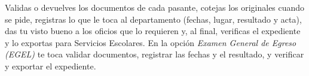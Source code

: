 \documentclass[11pt,a4paper]{article}
\begin{document}
{\small\tableofcontents}
\newpage
\begin{quevasahacer}
Validas o devuelves los documentos de cada pasante, cotejas los originales cuando se pide, registras lo que le toca al departamento (fechas, lugar, resultado y acta), das tu visto bueno a los oficios que lo requieren y, al final, verificas el expediente y lo exportas para Servicios Escolares. En la opción \emph{Examen General de Egreso (EGEL)} te toca validar documentos, registrar las fechas y el resultado, y verificar y exportar el expediente.
\end{quevasahacer}



\end{document}
